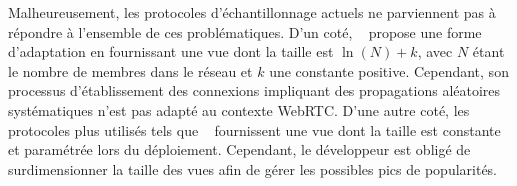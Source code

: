 





Malheureusement, les protocoles d'échantillonnage actuels ne parviennent pas à
répondre à l'ensemble de ces problématiques. D'un coté,
\SCAMP~\cite{ganesh2001scamp, ganesh2003peer} propose une forme d'adaptation en
fournissant une vue dont la taille est $\ln (N) + k$, avec $N$ étant le nombre
de membres dans le réseau et $k$ une constante positive. Cependant, son
processus d'établissement des connexions impliquant des propagations aléatoires
systématiques n'est pas adapté au contexte WebRTC. D'une autre coté, les
protocoles plus utilisés tels que \CYCLON~\cite{voulgaris2005cyclon} fournissent
une vue dont la taille est constante et paramétrée lors du
déploiement. Cependant, le développeur est obligé de surdimensionner la taille
des vues afin de gérer les possibles pics de popularités.



